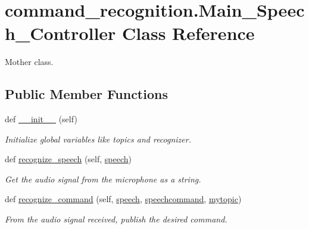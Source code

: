 \hypertarget{classcommand__recognition_1_1_main___speech___controller}{}\section{command\+\_\+recognition.\+Main\+\_\+\+Speech\+\_\+\+Controller Class Reference}
\label{classcommand__recognition_1_1_main___speech___controller}


Mother class.  


\subsection*{Public Member Functions}
\begin{DoxyCompactItemize}
\item 
def \hyperlink{classcommand__recognition_1_1_main___speech___controller_abfc55f738b24720625190c078d5de151}{\+\_\+\+\_\+init\+\_\+\+\_\+} (self)
\begin{DoxyCompactList}\small\item\em Initialize global variables like topics and recognizer. \end{DoxyCompactList}\item 
def \hyperlink{classcommand__recognition_1_1_main___speech___controller_a5d05c0bcca81f6fdcea9de648f114291}{recognize\+\_\+speech} (self, \hyperlink{classcommand__recognition_1_1_main___speech___controller_abbf94dd60a0a5244906d8842734eca55}{speech})
\begin{DoxyCompactList}\small\item\em Get the audio signal from the microphone as a string. \end{DoxyCompactList}\item 
def \hyperlink{classcommand__recognition_1_1_main___speech___controller_a8430ad5000f73886dbc9cde072f0d4ba}{recognize\+\_\+command} (self, \hyperlink{classcommand__recognition_1_1_main___speech___controller_abbf94dd60a0a5244906d8842734eca55}{speech}, \hyperlink{classcommand__recognition_1_1_main___speech___controller_a382d3bbe539ba93713ad9b4057e2a226}{speechcommand}, \hyperlink{classcommand__recognition_1_1_main___speech___controller_ace8e299f41b4b37fe5e3e060fa03781f}{mytopic})
\begin{DoxyCompactList}\small\item\em From the audio signal received, publish the desired command. \end{DoxyCompactList}\item 

\end{DoxyCompactItemize}

